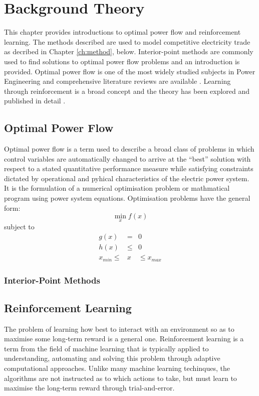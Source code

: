 \chapter{Background Theory}
\label{ch:background}
This chapter provides introductions to optimal power flow and reinforcement
learning.  The methods described are used to model competitive electricity
trade as decribed in Chapter \ref{ch:method}, below.  Interior-point methods
are commonly used to find solutions to optimal power flow problems and an
introduction is provided.  Optimal power flow is one of the most widely studied
subjects in Power Engineering and comprehensive literature reviews are
available \cite{momoh:part1,momoh:part2}.  Learning through reinforcement is a
broad concept and the theory has been explored and published in detail
\cite{suttonbarto:1998,bertsekas:96}.

\section{Optimal Power Flow}
\label{sec:opf}
Optimal power flow is a term used to describe a broad class of problems in
which control variables are automatically changed to arrive at the ``best''
solution with respect to a stated quantitative performance measure while
satisfying constraints dictated by operational and pyhical characteristics of
the electric power system.  It is the formulation of a numerical optimisation
problem or mathmatical program using power system equations.   Optimisation
problems have the general form:
\begin{equation}
\min_x f(x)
\end{equation}
subject to
\begin{eqnarray}
g(x)& =& 0\\
h(x)& \leq& 0\\
x_{min}\leq& x& \leq x_{max}
\end{eqnarray}

\subsection{Interior-Point Methods}

\section{Reinforcement Learning}
\label{sec:rl}
The problem of learning how best to interact with an environment so as to
maximise some long-term reward is a general one.  Reinforcement learning is a
term from the field of machine learning that is typically applied to
understanding, automating and solving this problem through adaptive
computational approaches.  Unlike many machine learning techinques, the
algorithms are not instructed as to which actions to take, but must learn to
maximise the long-term reward through trial-and-error.

